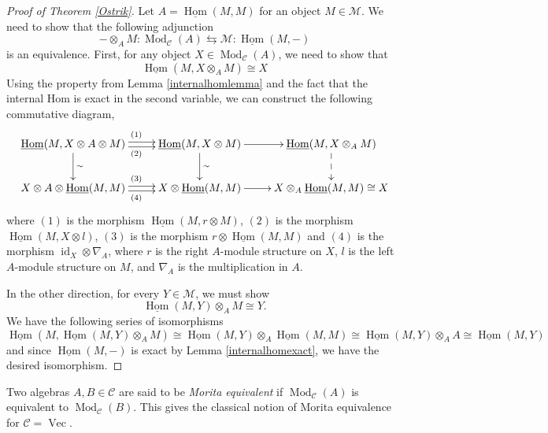 \documentclass[a4paper, 10pt]{book}
\theoremstyle{definition}
\numberwithin{equation}{chapter}
\newcommand\id{\operatorname{id}}
\newcommand\ot{\otimes}
\newcommand\Vect{\operatorname{Vec}}
\newcommand\Hom{\operatorname{Hom}}
\newcommand\Mod{\operatorname{Mod}}
\newcommand\M{\mathcal{M}}
\newcommand\C{\mathcal C}
\begin{document}
\begin{proof} [Proof of Theorem \ref{Ostrik}]
Let $A=\underline{\Hom} (M,M)$ for an object $M\in \M$. We need to show that the following adjunction \begin{equation}
	- \otimes_A M : \Mod_\C(A) \leftrightarrows  \M : \underline{\Hom}( M, -) 
\end{equation}is an equivalence. First, for any object $X\in \Mod_\C(A)$, we need to show that \begin{equation}
	\underline{\Hom}(M, X\otimes_A M) \cong X
\end{equation}
Using the property from Lemma \ref{internalhomlemma} and the fact that the internal Hom is exact in the second variable, we can construct the following commutative diagram, \begin{equation}\label{coequalizercommute}
	\xymatrix{\underline{\Hom}(M, X\otimes A \otimes M) \ar@<-.5ex>[r]_{(2)} \ar@<.5ex>[r]^{(1)}\ar[d]^{\sim} & \underline{\Hom}(M, X\otimes M) \ar[r]\ar[d]^{\sim} & \underline{\Hom}(M, X\otimes_A M)\ar@{-->}[d] \\
	X\otimes A \otimes \underline{\Hom}(M, M) \ar@<-.5ex>[r]_{(4)} \ar@<.5ex>[r]^{(3)} & X\otimes \underline{\Hom}(M,  M) \ar[r] & X\otimes_A \underline{\Hom}(M,  M)\cong X}
\end{equation} where $(1)$ is the morphism $\underline{\Hom}(M, r \otimes M)$, $(2)$ is the morphism $ \underline{\Hom}(M, X\otimes l)$, $(3)$ is the morphism $r\ot \underline{\Hom}(M,M)$ and $(4)$ is the morphism $\id_X \ot \nabla_A$, where $r$ is the right $A$-module structure on $X$, $l$ is the left $A$-module structure on $M$, and $\nabla_A$ is the multiplication in $A$.	

In the other direction, for every $Y \in \M$, we must show\begin{equation}
	 \underline{\Hom} (M,Y) \otimes_A M \cong Y.
\end{equation}
We have the following series of isomorphisms \begin{equation}
	\underline{\Hom}(M, \underline{\Hom} (M,Y) \otimes_A M) \cong \underline{\Hom} (M,Y)  \otimes_A \underline{\Hom}(M, M) \cong  \underline{\Hom} (M,Y)  \otimes_A A \cong \underline{\Hom} (M,Y)
\end{equation}
and since $\underline{\Hom}(M, -)$ is exact by Lemma \ref{internalhomexact}, we have the desired isomorphism.
\end{proof}

Two algebras $A, B \in \C$ are said to be \textit{Morita equivalent} if $\Mod_\C(A)$ is equivalent to $\Mod_\C(B)$. This gives the classical notion of Morita equivalence for $\C = \Vect$. 
\end{document}
